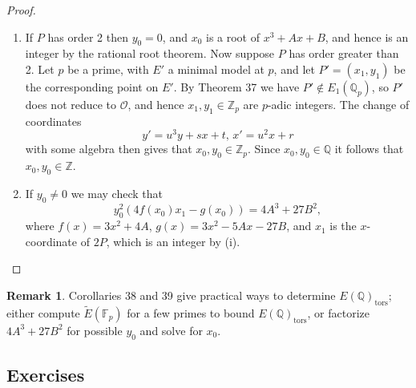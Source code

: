 \documentclass[a4paper]{article}
\theoremstyle{definition}
\newtheorem*{remark}{Remark}
\newcommand{\tors}{\mathrm{tors}}
\renewcommand{\O}{\mathcal{O}}
\newcommand{\F}{\mathbb{F}}
\newcommand{\Z}{\mathbb{Z}}
\newcommand{\Q}{\mathbb{Q}}
\begin{document}
\begin{proof}
    \begin{enumerate}[label=(\roman*)]
        \item If $P$ has order 2 then $y_0=0$, and $x_0$ is a root of $x^3+Ax+B$,
            and hence is an integer by the rational root theorem. Now suppose
            $P$ has order greater than 2. Let $p$ be a prime, with $E'$ a
            minimal model at $p$, and let $P'=(x_1,y_1)$ be the corresponding
            point on $E'$. By Theorem 37 we have $P'\notin E_1(\Q_p)$, so $P'$
            does not reduce to $\O$, and hence $x_1,y_1\in\Z_p$ are $p$-adic
            integers. The change of coordinates
            \begin{equation*}
                y'=u^3y+sx+t,\,x'=u^2x+r
            \end{equation*}
            with some algebra then gives that $x_0,y_0\in\Z_p$. Since
            $x_0,y_0\in\Q$ it follows that $x_0,y_0\in\Z$.

        \item If $y_0\ne0$ we may check that
            \begin{equation*}
                y_0^2(4f(x_0)x_1-g(x_0)) = 4A^3 + 27B^2,
            \end{equation*}
            where $f(x)=3x^2+4A$, $g(x)=3x^2-5Ax-27B$, and $x_1$ is the
            $x$-coordinate of $2P$, which is an integer by (i).
    \end{enumerate}
\end{proof}

\begin{remark}
    Corollaries 38 and 39 give practical ways to determine $E(\Q)_\tors$; either
    compute $\tilde E(\F_p)$ for a few primes to bound $E(\Q)_\tors$, or
    factorize $4A^3+27B^2$ for possible $y_0$ and solve for $x_0$.
\end{remark}

\subsection*{Exercises}
\end{document}
